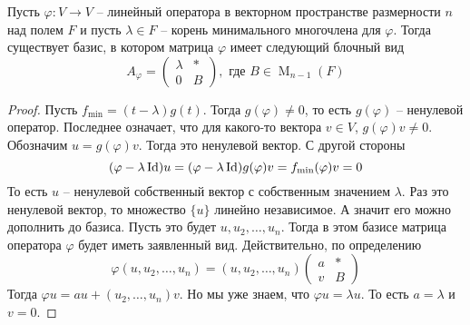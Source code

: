 \begin{claim}
Пусть $\varphi \colon V\to V$ -- линейный оператора в векторном пространстве размерности $n$ над полем $F$ и пусть $\lambda\in F$ -- корень минимального многочлена для $\varphi$. Тогда существует базис, в котором матрица $\varphi$ имеет следующий блочный вид
\[
A_\varphi = 
\begin{pmatrix}
{\lambda}&{*}\\
{0}&{B}
\end{pmatrix},\text{ где }
B\in \operatorname{M}_{n-1}(F)
\]
\end{claim}
\begin{proof}
Пусть $f_{\text{min}}=(t-\lambda)g(t)$. Тогда $g(\varphi) \neq 0$, то есть $g(\varphi)$ -- ненулевой оператор. Последнее означает, что для какого-то вектора $v\in V$, $g(\varphi)v\neq 0$. Обозначим $u = g(\varphi)v$. Тогда это ненулевой вектор. С другой стороны
\[
(\varphi - \lambda \operatorname{Id})u = (\varphi - \lambda \operatorname{Id})g(\varphi)v = f_\text{min}(\varphi)v = 0
\]
То есть $u$ -- ненулевой собственный вектор с собственным значением $\lambda$. Раз это ненулевой вектор, то множество $\{u\}$ линейно независимое. А значит его можно дополнить до базиса. Пусть это будет $u,u_2,\ldots,u_n$. Тогда в этом базисе матрица оператора $\varphi$ будет иметь заявленный вид. Действительно, по определению
\[
\varphi(u, u_2,\ldots, u_n) = (u, u_2,\ldots,u_n)
\begin{pmatrix}
{a}&{*}\\
{v}&{B}
\end{pmatrix}
\]
Тогда $\varphi u = a u + (u_2, \ldots, u_n)v$. Но мы уже знаем, что $\varphi u = \lambda u$. То есть $a = \lambda$ и $v = 0$.
\end{proof}

